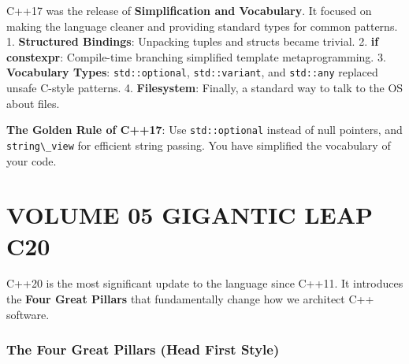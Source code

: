 C++17 was the release of \textbf{Simplification and Vocabulary}. It
focused on making the language cleaner and providing standard types for
common patterns. 1. \textbf{Structured Bindings}: Unpacking tuples and
structs became trivial. 2. \textbf{if constexpr}: Compile-time branching
simplified template metaprogramming. 3. \textbf{Vocabulary Types}:
\passthrough{\lstinline!std::optional!},
\passthrough{\lstinline!std::variant!}, and
\passthrough{\lstinline!std::any!} replaced unsafe C-style patterns. 4.
\textbf{Filesystem}: Finally, a standard way to talk to the OS about
files.

\textbf{The Golden Rule of C++17}: Use
\passthrough{\lstinline!std::optional!} instead of null pointers, and
\passthrough{\lstinline!string\_view!} for efficient string passing. You
have simplified the vocabulary of your code.

\hypertarget{volume-05-gigantic-leap-c20}{%
\section{VOLUME 05 GIGANTIC LEAP
C20}\label{volume-05-gigantic-leap-c20}}

C++20 is the most significant update to the language since C++11. It
introduces the \textbf{Four Great Pillars} that fundamentally change how
we architect C++ software.

\hypertarget{the-four-great-pillars-head-first-style}{%
\subsubsection{The Four Great Pillars (Head First
Style)}\label{the-four-great-pillars-head-first-style}}

